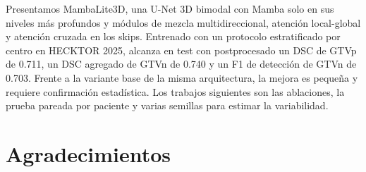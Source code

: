 \documentclass[conference]{IEEEtran}
\begin{document}
Presentamos MambaLite3D, una U-Net 3D bimodal con Mamba solo en sus niveles más profundos y módulos de mezcla multidireccional, atención local-global y atención cruzada en los skips. Entrenado con un protocolo estratificado por centro en HECKTOR 2025, alcanza en test con postprocesado un DSC de GTVp de 0.711, un DSC agregado de GTVn de 0.740 y un F1 de detección de GTVn de 0.703. Frente a la variante base de la misma arquitectura, la mejora es pequeña y requiere confirmación estadística. Los trabajos siguientes son las ablaciones, la prueba pareada por paciente y varias semillas para estimar la variabilidad.

\section*{Agradecimientos}



\end{document}

